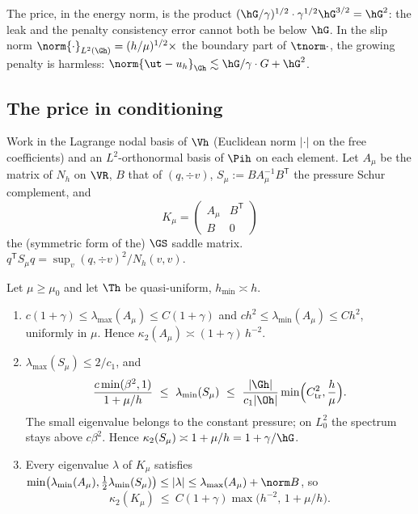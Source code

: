 The price, in the energy norm, is the product $(\hG/\gamma)^{1/2}\cdot\gamma^{1/2}\hG^{3/2}=\hG^2$: the leak and the penalty consistency error cannot both be below $\hG$. In the slip norm $\norm{\cdot}_{L^2(\Gh)}=(h/\mu)^{1/2}\times$ the boundary part of $\tnorm\cdot$, the growing penalty is harmless: $\norm{\ut-u_h}_{\Gh}\lesssim\hG/\gamma\cdot G+\hG^2$.

\subsection{The price in conditioning}

Work in the Lagrange nodal basis of $\Vh$ (Euclidean norm $|\cdot|$ on the free coefficients) and an $L^2$-orthonormal basis of $\Pih$ on each element. Let $A_\mu$ be the matrix of $N_h$ on $\VR$, $B$ that of $(q,\div v)$, $S_\mu:=BA_\mu^{-1}B^{\mathsf T}$ the pressure Schur complement, and
\[
K_\mu=\begin{pmatrix}A_\mu&B^{\mathsf T}\\ B&0\end{pmatrix}
\]
the (symmetric form of the) $\GS$ saddle matrix. $q^{\mathsf T}S_\mu q=\sup_v(q,\div v)^2/N_h(v,v)$.

\begin{proposition}[Conditioning]\label{rs:cond}
Let $\mu\ge\mu_0$ and let $\Th$ be quasi-uniform, $h_{\min}\asymp h$.
\begin{enumerate}[label=(\roman*)]
\item $c(1+\gamma)\le\lambda_{\max}(A_\mu)\le C(1+\gamma)$ and $ch^2\le\lambda_{\min}(A_\mu)\le Ch^2$, uniformly in $\mu$. Hence $\kappa_2(A_\mu)\asymp(1+\gamma)\,h^{-2}$.
\item $\lambda_{\max}(S_\mu)\le2/c_1$, and
\[
\frac{c\min(\beta^2,1)}{1+\mu/h}\ \le\ \lambda_{\min}(S_\mu)\ \le\ \frac{|\Gh|}{c_1|\Oh|}\min\Bigl(C_{\mathrm{tr}}^2,\frac h\mu\Bigr).
\]
The small eigenvalue belongs to the constant pressure; on $L^2_0$ the spectrum stays above $c\beta^2$. Hence $\kappa_2(S_\mu)\asymp1+\mu/h=1+\gamma/\hG$.
\item Every eigenvalue $\lambda$ of $K_\mu$ satisfies $\min\bigl(\lambda_{\min}(A_\mu),\tfrac12\lambda_{\min}(S_\mu)\bigr)\le|\lambda|\le\lambda_{\max}(A_\mu)+\norm B$, so
\[
\kappa_2(K_\mu)\ \le\ C(1+\gamma)\max\bigl(h^{-2},\,1+\mu/h\bigr).
\]
\end{enumerate}
\end{proposition}


